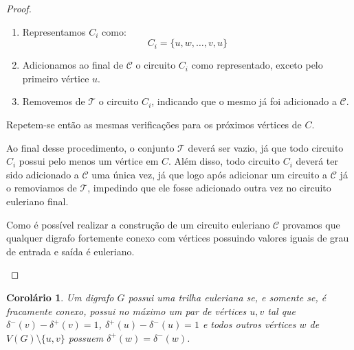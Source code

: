 \documentclass[12pt, a4paper]{article}
\newtheorem{corollary}{Corolário}
\begin{document}
\begin{proof}
\begin{enumerate}
\begin{tcolorbox}
                \begin{enumerate}
                    \item Representamos $C_i$ como: 
                        \[
                            C_i = \{u, w, \dots, v, u\}
                        \]

                    \item Adicionamos ao final de $\mathcal{C}$ o circuito $C_i$ como representado, exceto pelo primeiro vértice $u$. 

                    \item Removemos de $\mathcal{T}$ o circuito $C_i$, indicando que o mesmo já foi adicionado a $\mathcal{C}$.

                \end{enumerate}

                Repetem-se então as mesmas verificações para os próximos vértices de $C$.
            \end{tcolorbox}


Ao final desse procedimento, o conjunto $\mathcal{T}$ deverá ser vazio, já que todo circuito $C_i$ possui pelo menos um vértice em $C$. Além disso, todo circuito $C_i$ deverá ter sido adicionado a $\mathcal{C}$ uma única vez, já que logo após adicionar um circuito a $\mathcal{C}$ já o removiamos de $\mathcal{T}$, impedindo que ele fosse adicionado outra vez no circuito euleriano final.

Como é possível realizar a construção de um circuito euleriano $\mathcal{C}$ provamos que qualquer digrafo fortemente conexo com vértices possuindo valores iguais de grau de entrada e saída é euleriano.

    \end{enumerate}
\end{proof}

\begin{corollary} 
    Um digrafo $G$ possui uma trilha euleriana se, e somente se, é fracamente conexo, possui no máximo um par de vértices $u, v$ tal que $\delta^-(v) - \delta^+(v) = 1$, $\delta^+(u) - \delta^-(u) = 1$ e todos outros vértices $w$ de $V(G) \setminus \{u, v\}$ possuem $\delta^+(w) = \delta^-(w)$.
\end{corollary}
\end{document}
